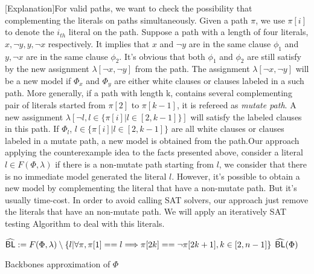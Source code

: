  [Explanation]For valid paths, we want to check the possibility that complementing the literals on paths simultaneously. Given a path $\pi$, we use $\pi[i]$ to denote the $i_{th}$ literal on the path. Suppose a path with a length of four literals, $x, \neg y, y, \neg x$ respectively. It implies that $x$ and $\neg y$ are in the same clause $\phi_1$ and $y, \neg x$ are in the same clause $\phi_2$. It's obvious that both $\phi_1$ and $\phi_2$ are still satisfy by the new assignment $\lambda[\neg x, \neg y]$ from the path. The assignment $\lambda[\neg x, \neg y]$ will be a new model if $\Phi_x$ and $\Phi_y$ are either white clauses or clauses labeled in a such path. More generally, if a path with length k, contains several complementing pair of literals started from $\pi[2]$ to $\pi[k-1]$, it is refereed as \emph{mutate path}. A new assignment $\lambda[\neg l, l\in\{\pi[i] | l\in[2, k-1]\}]$ will satisfy the labeled clauses in this path. If $\Phi_l$, $l\in\{\pi[i] | l\in[2, k-1]\}$ are all white clauses or clauses labeled in a mutate path, a new model is obtained from the path.Our approach applying the counterexample idea to the facts presented above, consider a literal $l\in F(\Phi, \lambda)$ if there is a non-mutate path starting from $l$, we consider that there is no immediate model generated the literal $l$.
 However, it's possible to obtain a new model by complementing the literal that have a non-mutate path. But it's usually time-cost. In order to avoid calling SAT solvers, our approach just remove the literals that have an non-mutate path. We will apply an iteratively SAT testing Algorithm to deal with this literals.


\begin{algorithm}
\SetAlgoShortEnd
\SetFillComment
{}

${\sf \widehat{BL}}:=F(\Phi, \lambda)\setminus\{l | \forall \pi, \pi[1]==l\Longrightarrow\pi[2k]==\neg\pi[2k+1], k\in[2,n-1]\}$\;
\Return ${\sf \widehat{BL}}(\Phi)$\;
\caption{Backbones approximation of $\Phi$}
\label{alg:nBLo}
\end{algorithm}

